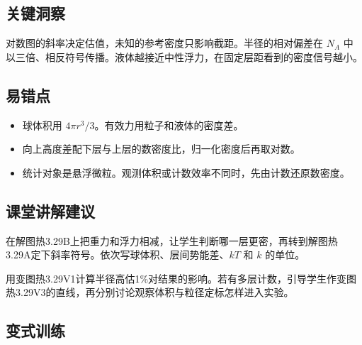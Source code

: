 \documentclass[UTF8,fontset=fandol,a4paper,11pt]{ctexart}
\begin{document}


\subsection*{关键洞察}

对数图的斜率决定估值，未知的参考密度只影响截距。半径的相对偏差在 $N_A$ 中以三倍、相反符号传播。液体越接近中性浮力，在固定层距看到的密度信号越小。



\subsection*{易错点}

\begin{itemize}
\item 球体积用 $4\pi r^3/3$。有效力用粒子和液体的密度差。
\item 向上高度差配下层与上层的数密度比，归一化密度后再取对数。
\item 统计对象是悬浮微粒。观测体积或计数效率不同时，先由计数还原数密度。
\end{itemize}



\subsection*{课堂讲解建议}

在解图热3.29B上把重力和浮力相减，让学生判断哪一层更密，再转到解图热3.29A定下斜率符号。依次写球体积、层间势能差、$kT$ 和 $k$ 的单位。

用变图热3.29V1计算半径高估1\%对结果的影响。若有多层计数，引导学生作变图热3.29V3的直线，再分别讨论观察体积与粒径定标怎样进入实验。



\subsection*{变式训练}
\end{document}
